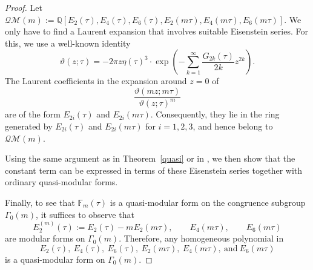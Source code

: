\documentclass[10pt,a4paper]{amsart}
\numberwithin{equation}{section}
\theoremstyle{definition}
\begin{document}
\begin{proof} Let ${\mathcal{QM}}(m):=\mathbb{Q}[E_2(\tau),E_4(\tau),E_6(\tau),E_2(m \tau),E_4(m \tau),E_6(m \tau)]$.
We only have to find a Laurent expansion that involves suitable Eisenstein series.
For this, we use a well-known identity \cite{Lang}
\[
\vartheta(z;\tau)=-2 \pi z \eta(\tau)^3 \cdot \exp \left(-\sum_{k=1}^\infty \frac{G_{2k}(\tau)}{2k} z^{2k} \right).
\]
The Laurent coefficients in the expansion around $z=0$ of
\[
\frac{\vartheta(mz; m\tau)}{\vartheta(z; \tau)^m}
\]
are of the form $E_{2i}(\tau)$ and $E_{2i}(m\tau)$. Consequently, they lie in the ring generated by $E_{2i}(\tau)$ and $E_{2i}(m\tau)$ for $i=1,2,3$, and hence belong to $\mathcal{QM}(m)$.

Using the same argument as in Theorem~\ref{quasi} or in \cite{AM}, we then show that the constant term can be expressed in terms of these Eisenstein series together with ordinary quasi-modular forms.

Finally, to see that $\mathbb{F}_m(\tau)$ is a quasi-modular form on the congruence subgroup $\Gamma_0(m)$, it suffices to observe that
\[
E^{(m)}_2(\tau) := E_2(\tau) - m E_2(m\tau), \qquad
E_4(m\tau), \qquad
E_6(m\tau)
\]
are modular forms on $\Gamma_0(m)$.
Therefore, any homogeneous polynomial in
\[
E_2(\tau),\ E_4(\tau),\ E_6(\tau),\ E_2(m\tau),\ E_4(m\tau),\ \text{and} \ E_6(m\tau)
\]
is a quasi-modular form on $\Gamma_0(m)$.
\end{proof}
\end{document}
